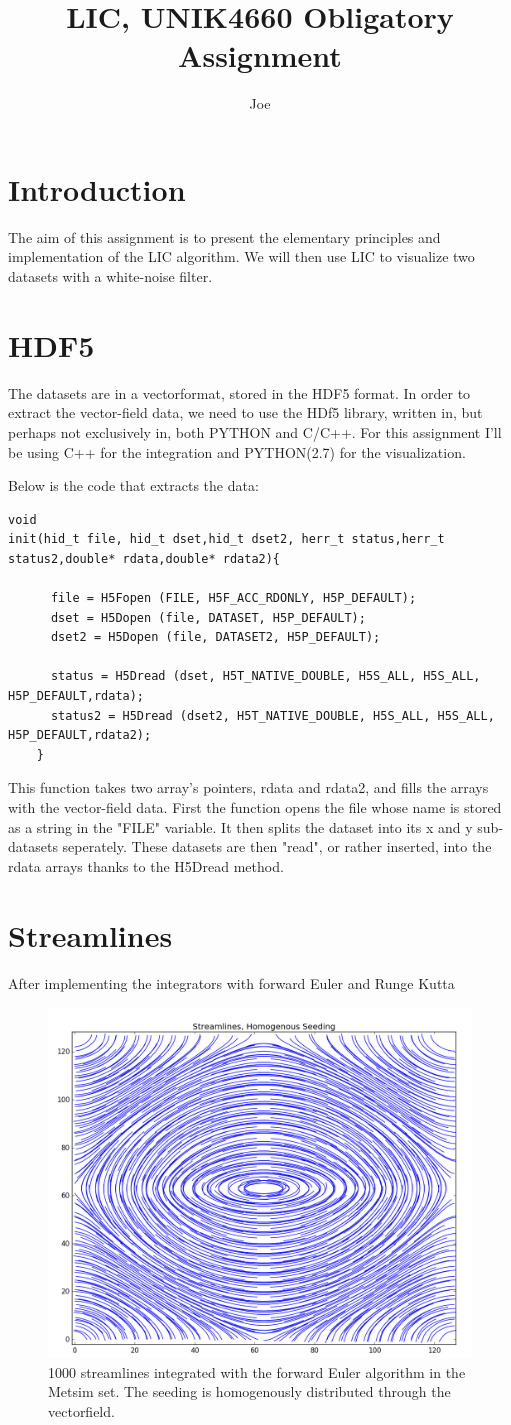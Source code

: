 \documentclass[a4paper,10pt]{article}
\title{LIC, UNIK4660 Obligatory Assignment}
\author{Joe}
\begin{document}
\maketitle
\section{Introduction}
The aim of this assignment is to present the elementary principles and implementation of the LIC algorithm. We will then use LIC to visualize two datasets with a white-noise filter.


\section{HDF5}
The datasets are in a vectorformat, stored in the HDF5 format. In order to extract the vector-field data, we need to use the HDf5 library, written in, but perhaps not exclusively in, both PYTHON and C/C++.
For this assignment I'll be using C++ for the integration and PYTHON(2.7) for the visualization.

Below is the code that extracts the data:
\begin{lstlisting}
void 
init(hid_t file, hid_t dset,hid_t dset2, herr_t status,herr_t status2,double* rdata,double* rdata2){

      file = H5Fopen (FILE, H5F_ACC_RDONLY, H5P_DEFAULT);
      dset = H5Dopen (file, DATASET, H5P_DEFAULT);
      dset2 = H5Dopen (file, DATASET2, H5P_DEFAULT);

      status = H5Dread (dset, H5T_NATIVE_DOUBLE, H5S_ALL, H5S_ALL, H5P_DEFAULT,rdata);
      status2 = H5Dread (dset2, H5T_NATIVE_DOUBLE, H5S_ALL, H5S_ALL, H5P_DEFAULT,rdata2);
    }
\end{lstlisting}
This function takes two array's pointers, rdata and rdata2, and fills the arrays with the vector-field data. 
First the function opens the file whose name is stored as a string in the "FILE" variable.
It then splits the dataset into its x and y sub-datasets seperately. These datasets are then "read", or rather inserted, into the rdata arrays thanks to the H5Dread method.
\section{Streamlines}
After implementing the integrators with forward Euler and Runge Kutta

\begin{figure}\centering
 \includegraphics[width=0.55\linewidth]{homo}
 \caption{1000 streamlines integrated with the forward Euler algorithm in the Metsim set. The seeding is homogenously distributed through the vectorfield.}
 \label{fig1}
\end{figure}
\end{document}

